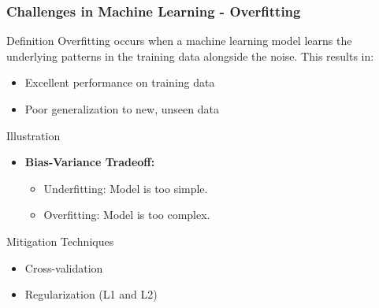 \documentclass[aspectratio=169]{beamer}
\begin{document}
\begin{frame}[fragile]
    \frametitle{Challenges in Machine Learning - Overfitting}
    \begin{block}{Definition}
        Overfitting occurs when a machine learning model learns the underlying patterns in the training data alongside the noise. This results in:
        \begin{itemize}
            \item Excellent performance on training data
            \item Poor generalization to new, unseen data
        \end{itemize}
    \end{block}

    \begin{block}{Illustration}
        \begin{itemize}
            \item \textbf{Bias-Variance Tradeoff:}
                \begin{itemize}
                    \item Underfitting: Model is too simple.
                    \item Overfitting: Model is too complex.
                \end{itemize}
        \end{itemize}
    \end{block}

    \begin{block}{Mitigation Techniques}
        \begin{itemize}
            \item Cross-validation
            \item Regularization (L1 and L2)
        \end{itemize}
    \end{block}
\end{frame}
\end{document}
